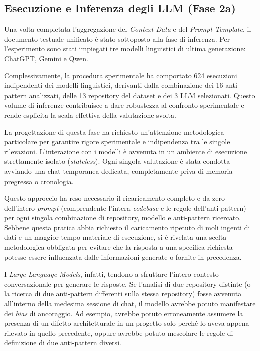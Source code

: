 \subsection{Esecuzione e Inferenza degli LLM (Fase 2a)}

Una volta completata l'aggregazione del \textit{Context Data} e del \textit{Prompt Template}, il documento testuale unificato è stato sottoposto alla fase di inferenza. Per l'esperimento sono stati impiegati tre modelli linguistici di ultima generazione: ChatGPT, Gemini e Qwen.

Complessivamente, la procedura sperimentale ha comportato 624 esecuzioni indipendenti dei modelli linguistici, derivanti dalla combinazione dei 16 anti-pattern analizzati, delle 13 repository del dataset e dei 3 LLM selezionati. Questo volume di inferenze contribuisce a dare robustezza al confronto sperimentale e rende esplicita la scala effettiva della valutazione svolta.

La progettazione di questa fase ha richiesto un'attenzione metodologica particolare per garantire rigore sperimentale e indipendenza tra le singole rilevazioni. L'interazione con i modelli è avvenuta in un ambiente di esecuzione strettamente isolato (\textit{stateless}). Ogni singola valutazione è stata condotta avviando una chat temporanea dedicata, completamente priva di memoria pregressa o cronologia.

Questo approccio ha reso necessario il ricaricamento completo e da zero dell'intero \textit{prompt} (comprendente l'intera \textit{codebase} e le regole dell'anti-pattern) per ogni singola combinazione di repository, modello e anti-pattern ricercato. Sebbene questa pratica abbia richiesto il caricamento ripetuto di moli ingenti di dati e un maggior tempo materiale di esecuzione, si è rivelata una scelta metodologica obbligata per evitare che la risposta a una specifica richiesta potesse essere influenzata dalle informazioni generate o fornite in precedenza.

I \textit{Large Language Models}, infatti, tendono a sfruttare l'intero contesto conversazionale per generare le risposte. Se l'analisi di due repository distinte (o la ricerca di due anti-pattern differenti sulla stessa repository) fosse avvenuta all'interno della medesima sessione di chat, il modello avrebbe potuto manifestare dei \textit{bias} di ancoraggio. Ad esempio, avrebbe potuto erroneamente assumere la presenza di un difetto architetturale in un progetto solo perché lo aveva appena rilevato in quello precedente, oppure avrebbe potuto mescolare le regole di definizione di due anti-pattern diversi.

